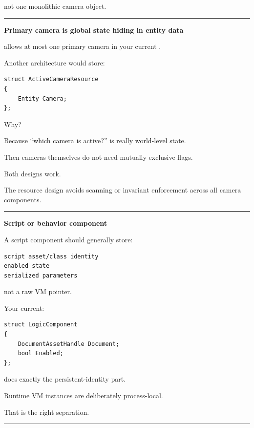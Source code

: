 not one monolithic camera object.

\begin{center}\rule{0.5\linewidth}{0.5pt}\end{center}

\textbf{Primary camera is global state hiding in entity data}

 allows at most one primary camera in your current .

Another architecture would store:

\begin{verbatim}
struct ActiveCameraResource
{
    Entity Camera;
};
\end{verbatim}

Why?

Because ``which camera is active?'' is really world-level state.

Then cameras themselves do not need mutually exclusive  flags.

Both designs work.

The resource design avoids scanning or invariant enforcement across all camera components.

\begin{center}\rule{0.5\linewidth}{0.5pt}\end{center}

\textbf{Script or behavior component}

A script component should generally store:

\begin{verbatim}
script asset/class identity
enabled state
serialized parameters
\end{verbatim}

not a raw VM pointer.

Your current:

\begin{verbatim}
struct LogicComponent
{
    DocumentAssetHandle Document;
    bool Enabled;
};
\end{verbatim}

does exactly the persistent-identity part.

Runtime VM instances are deliberately process-local.

That is the right separation.

\begin{center}\rule{0.5\linewidth}{0.5pt}\end{center}

